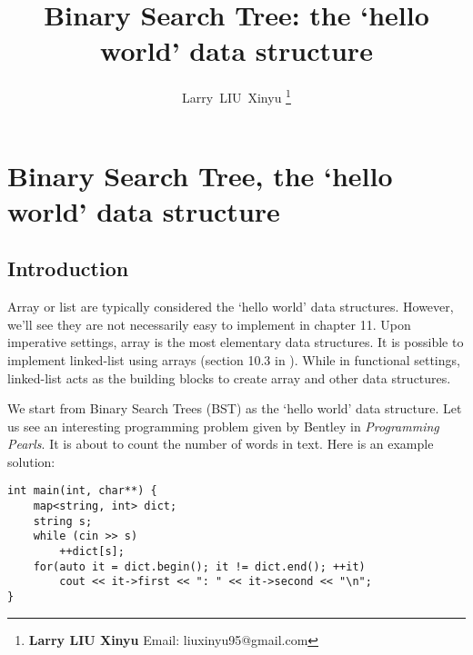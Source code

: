 \documentclass{article}
\begin{document}


\title{Binary Search Tree: the `hello world' data structure}

\author{Larry~LIU~Xinyu
\thanks{{\bfseries Larry LIU Xinyu } \newline
  Email: liuxinyu95@gmail.com \newline}
  }

\maketitle
\fi


\ifx\wholebook\relax
\chapter{Binary Search Tree, the `hello world' data structure}
\fi

\section{Introduction}
\label{introduction} 

Array or list are typically considered the `hello world' data structures. However, we'll see they are not necessarily easy to implement in chapter 11. Upon imperative settings, array is the most elementary data structures. It is possible to implement linked-list using arrays (section  10.3 in \cite{CLRS}). While in functional settings, linked-list acts as the building blocks to create array and other data structures.

We start from Binary Search Trees (BST) as the `hello world' data structure. Let us see an interesting programming problem given by Bentley in {\em Programming Pearls}\cite{Bentley}. It is about to count the number of words in text. Here is an example solution:

\lstset{language=C++, frame=single}
\begin{lstlisting}
int main(int, char**) {
    map<string, int> dict;
    string s;
    while (cin >> s)
        ++dict[s];
    for(auto it = dict.begin(); it != dict.end(); ++it)
        cout << it->first << ": " << it->second << "\n";
}
\end{lstlisting}
\end{document}
